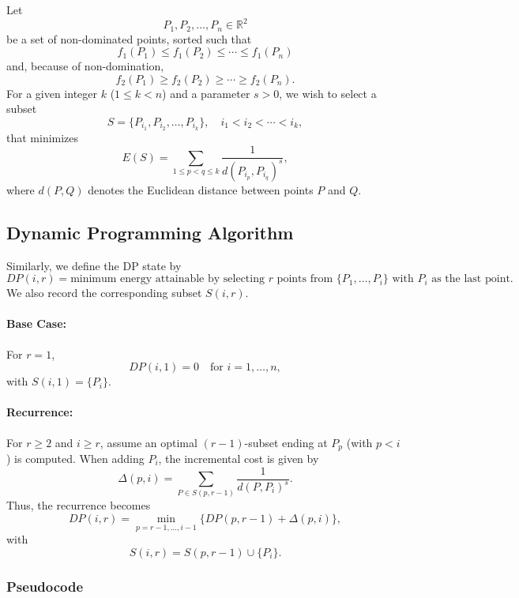 \documentclass[11pt]{article}
\begin{document}
Let
\[
P_1, P_2, \dots, P_n \in \mathbb{R}^2
\]
be a set of non-dominated points, sorted such that 
\[
f_1(P_1) \le f_1(P_2) \le \cdots \le f_1(P_n)
\]
and, because of non-domination, 
\[
f_2(P_1) \ge f_2(P_2) \ge \cdots \ge f_2(P_n).
\]
For a given integer \(k\) (\(1 \le k < n\)) and a parameter \(s>0\), we wish to select a subset
\[
S=\{P_{i_1},P_{i_2},\dots,P_{i_k}\}, \quad i_1 < i_2 < \cdots < i_k,
\]
that minimizes
\[
E(S)=\sum_{1\le p<q\le k}\frac{1}{d(P_{i_p},P_{i_q})^s},
\]
where \(d(P,Q)\) denotes the Euclidean distance between points \(P\) and \(Q\).

\subsection{Dynamic Programming Algorithm}

Similarly, we define the DP state by
\[
DP(i,r)=\text{minimum energy attainable by selecting \(r\) points from } \{P_1,\dots,P_i\} \text{ with } P_i \text{ as the last point.}
\]
We also record the corresponding subset \(S(i,r)\).

\paragraph{Base Case:} For \(r=1\),
\[
DP(i,1)=0 \quad \text{for } i=1,\dots,n,
\]
with \(S(i,1)=\{P_i\}\).

\paragraph{Recurrence:} For \(r\ge2\) and \(i\ge r\), assume an optimal \((r-1)\)-subset ending at \(P_p\) (with \(p < i\)) is computed. When adding \(P_i\), the incremental cost is given by
\[
\Delta(p,i)=\sum_{P\in S(p,r-1)} \frac{1}{d(P,P_i)^s}.
\]
Thus, the recurrence becomes
\[
DP(i,r)=\min_{p=r-1,\ldots,i-1}\{DP(p,r-1)+\Delta(p,i)\},
\]
with
\[
S(i,r)=S(p,r-1)\cup\{P_i\}.
\]

\subsubsection*{Pseudocode}
\end{document}
